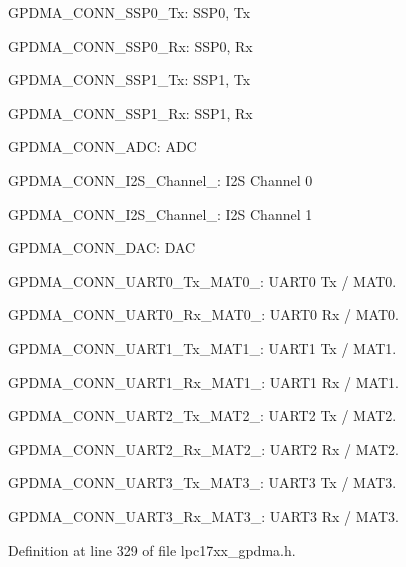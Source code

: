 \begin{DoxyItemize}
\item \-G\-P\-D\-M\-A\-\_\-\-C\-O\-N\-N\-\_\-\-S\-S\-P0\-\_\-\-Tx\-: \-S\-S\-P0, \-Tx
\item \-G\-P\-D\-M\-A\-\_\-\-C\-O\-N\-N\-\_\-\-S\-S\-P0\-\_\-\-Rx\-: \-S\-S\-P0, \-Rx
\item \-G\-P\-D\-M\-A\-\_\-\-C\-O\-N\-N\-\_\-\-S\-S\-P1\-\_\-\-Tx\-: \-S\-S\-P1, \-Tx
\item \-G\-P\-D\-M\-A\-\_\-\-C\-O\-N\-N\-\_\-\-S\-S\-P1\-\_\-\-Rx\-: \-S\-S\-P1, \-Rx
\item \-G\-P\-D\-M\-A\-\_\-\-C\-O\-N\-N\-\_\-\-A\-D\-C\-: \-A\-D\-C
\item \-G\-P\-D\-M\-A\-\_\-\-C\-O\-N\-N\-\_\-\-I2\-S\-\_\-\-Channel\-\_\-: \-I2\-S \-Channel 0
\item \-G\-P\-D\-M\-A\-\_\-\-C\-O\-N\-N\-\_\-\-I2\-S\-\_\-\-Channel\-\_\-: \-I2\-S \-Channel 1
\item \-G\-P\-D\-M\-A\-\_\-\-C\-O\-N\-N\-\_\-\-D\-A\-C\-: \-D\-A\-C
\item \-G\-P\-D\-M\-A\-\_\-\-C\-O\-N\-N\-\_\-\-U\-A\-R\-T0\-\_\-\-Tx\-\_\-\-M\-A\-T0\-\_\-: \-U\-A\-R\-T0 \-Tx / \-M\-A\-T0.
\item \-G\-P\-D\-M\-A\-\_\-\-C\-O\-N\-N\-\_\-\-U\-A\-R\-T0\-\_\-\-Rx\-\_\-\-M\-A\-T0\-\_\-: \-U\-A\-R\-T0 \-Rx / \-M\-A\-T0.
\item \-G\-P\-D\-M\-A\-\_\-\-C\-O\-N\-N\-\_\-\-U\-A\-R\-T1\-\_\-\-Tx\-\_\-\-M\-A\-T1\-\_\-: \-U\-A\-R\-T1 \-Tx / \-M\-A\-T1.
\item \-G\-P\-D\-M\-A\-\_\-\-C\-O\-N\-N\-\_\-\-U\-A\-R\-T1\-\_\-\-Rx\-\_\-\-M\-A\-T1\-\_\-: \-U\-A\-R\-T1 \-Rx / \-M\-A\-T1.
\item \-G\-P\-D\-M\-A\-\_\-\-C\-O\-N\-N\-\_\-\-U\-A\-R\-T2\-\_\-\-Tx\-\_\-\-M\-A\-T2\-\_\-: \-U\-A\-R\-T2 \-Tx / \-M\-A\-T2.
\item \-G\-P\-D\-M\-A\-\_\-\-C\-O\-N\-N\-\_\-\-U\-A\-R\-T2\-\_\-\-Rx\-\_\-\-M\-A\-T2\-\_\-: \-U\-A\-R\-T2 \-Rx / \-M\-A\-T2.
\item \-G\-P\-D\-M\-A\-\_\-\-C\-O\-N\-N\-\_\-\-U\-A\-R\-T3\-\_\-\-Tx\-\_\-\-M\-A\-T3\-\_\-: \-U\-A\-R\-T3 \-Tx / \-M\-A\-T3.
\item \-G\-P\-D\-M\-A\-\_\-\-C\-O\-N\-N\-\_\-\-U\-A\-R\-T3\-\_\-\-Rx\-\_\-\-M\-A\-T3\-\_\-: \-U\-A\-R\-T3 \-Rx / \-M\-A\-T3. 
\end{DoxyItemize}

\-Definition at line 329 of file lpc17xx\-\_\-gpdma.\-h.

